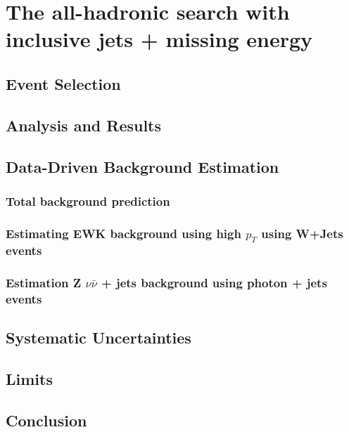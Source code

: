 \chapter{The all-hadronic search with inclusive jets + missing energy}
\section{Event Selection}
\section{Analysis and Results}
\section{Data-Driven Background Estimation}
\subsection{Total background prediction}
\subsection{Estimating EWK background using high $p_{T}$ using W+Jets events}
\subsection{Estimation Z  $\nu \bar{\nu}$ + jets background using photon + jets events}
\section{Systematic Uncertainties}
\section{Limits}
\section{Conclusion}

